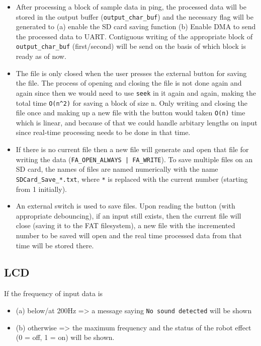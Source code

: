 \documentclass[11pt]{article}
\begin{document}
\begin{itemize}
\item After processing a block of sample data in ping, the processed data will be stored in the output buffer (\texttt{output\_char\_buf}) and the necessary flag will be generated to (a) enable the SD card saving function (b) Enable DMA to send the processed data to UART. Contiguous writing of the appropriate block of \texttt{output\_char\_buf} (first/second) will be send on the basis of which block is ready as of now.

\item The file is only closed when the user presses the external button for saving the file. The process of opening and closing the file is not done again and again since then we would need to use \texttt{seek} in it again and again, making the total time \texttt{O(n\textasciicircum{}2)} for saving a block of size n. Only writing and closing the file once and making up a new file with the button would taken \texttt{O(n)} time which is linear, and because of that we could handle arbitary lengths on input since real-time processing needs to be done in that time.

\item If there is no current file then a new file will generate and open that file for writing the data (\texttt{FA\_OPEN\_ALWAYS | FA\_WRITE}). To save multiple files on an SD card, the names of files are named numerically with the name \texttt{SDCard\_Save\_*.txt}, where \texttt{*} is replaced with the current number (starting from 1 initially).

\item An external switch is used to save files. Upon reading the button (with appropriate debouncing), if an input still exists, then the current file will close (saving it to the FAT filesystem), a new file with the incremented number to be saved will open and the real time processed data from that time will be stored there.
\end{itemize}


\subsection{LCD}
\label{sec:org4fc51e4}

If the frequency of input data is
\begin{itemize}
\item (a) below/at 200Hz => a message saying \texttt{No sound detected} will be shown
\item (b) otherwise => the maximum frequency and the status of the robot effect (0 = off, 1 = on) will be shown.
\end{itemize}
\end{document}
